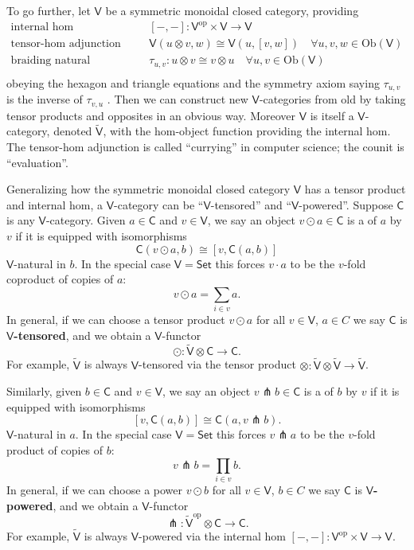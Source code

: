 \documentclass{amsart}
\newcommand{\define}[1]{{\bf \boldmath{#1}}}
\theoremstyle{definition}
\newcommand{\Set}{\mathsf{Set}}
\newcommand{\V}{\mathsf{V}}
\newcommand{\C}{\mathsf{C}}
\newcommand{\op}{\mathrm{op}}
\newcommand{\Obj}{\mathrm{Ob}}
\newcommand{\pfk}{\pitchfork}
\newcommand{\maps}{\colon}
\begin{document}
To go further, let $\V$ be a symmetric monoidal closed category, providing
\[\begin{array}{rl}
\text{internal hom} & [-,-]\maps\V^\op \times \V \to \V\\
\text{tensor-hom adjunction} & \V(u\otimes v,w) \cong \V(u,[v,w]) \quad \forall u,v,w \in \Obj(\V)\\
\text{braiding natural isomorphism} & \tau_{u,v}\maps u \otimes v \cong v \otimes u \quad \forall u,v \in \Obj(\V)\\
\end{array}\]
obeying the hexagon and triangle equations and the symmetry axiom saying $\tau_{u,v}$ is the inverse of $\tau_{v,u}$ \cite{maclane}.   Then we can construct new $\V$-categories from old by taking tensor products and opposites in an obvious way.   Moreover $\V$ is itself a $\V$-category, denoted $\tilde{\V}$, with the hom-object function providing the internal hom.  The tensor-hom adjunction is called ``currying'' in computer science; the counit is ``evaluation''.  

Generalizing how the symmetric monoidal closed category $\V$ has a tensor product and internal hom, a $\V$-category can be ``$\V$-tensored'' and ``$\V$-powered''.   
Suppose $\C$ is any $\V$-category.  Given $a \in \C$ and $v \in \V$, we say an object 
$v \odot a \in \C$ is a \define{tensor product} of $a$ by $v$ if it is equipped with isomorphisms
\begin{equation}\label{eq:tensor}
	\C(v\odot a,b) \cong \left[v, \C(a,b)\right]
\end{equation}
$\V$-natural in $b$.
In the special case $\V = \Set$ this forces $v \cdot a$ to be the $v$-fold coproduct 
of copies of $a$:
\[       v \odot a = \sum_{i \in v} a . \]
In general, if we can choose a tensor product $v \odot a$ for all $v \in \V$, $a \in C$
we say $\C$ is \textbf{$\V$-tensored}, and we obtain a $\V$-functor
\[
	\odot \maps \tilde{\V} \otimes \C \to \C.
\]
For example, $\tilde{\V}$ is always $\V$-tensored via the tensor product
$ \otimes \maps \tilde{\V} \otimes \tilde{\V} \to \tilde{\V} $.

Similarly, given $b \in \C$ and $v \in \V$, we say an object $v \pfk b \in \C$ is a \define{power} of $b$ by $v$ if it is equipped with isomorphisms
\begin{equation}\label{eq:power}
		 \left[v, \C(a,b)\right] \cong \C(a,v\pfk b) .
\end{equation}
$\V$-natural in $a$.  In the special case $\V = \Set$  this forces $v \pfk a$ to be the $v$-fold product of copies of $b$:
\[          v \pfk b = \prod_{i \in v} b . \]
In general, if we can choose a power $v \odot b$ for all $v \in \V$, $b \in C$
we say $\C$ is \textbf{$\V$-powered}, and we obtain a $\V$-functor
\[
\pfk \maps \tilde{\V}^\op \otimes \C \to \C .
\]
For example, $\tilde{\V}$ is always $\V$-powered via the internal hom
$[-,-] \maps \V^\op \times \V \to \V $.
\end{document}
